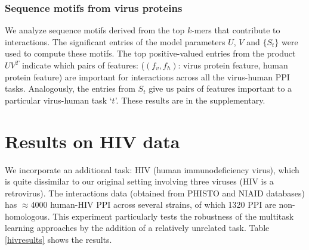 \documentclass{bioinfo}
\begin{document}







\subsubsection{Sequence motifs from virus proteins}
We analyze sequence motifs derived from the top $k$-mers that contribute to interactions. The significant entries of the model parameters $U$, $V$ and $\{S_t\}$ were used to 
compute these motifs. The top positive-valued entries from the product $U V^T$ indicate which pairs of features: ($(f_v, f_h)$: virus protein feature, human protein feature) are important for interactions across all the virus-human PPI tasks.
Analogously, the entries from $S_t$ give us pairs of features important to a particular virus-human task `$t$'.
These results are in the supplementary.\\


\section{Results on HIV data}
We incorporate an additional task: HIV (human immunodeficiency virus), which is quite dissimilar to our original setting involving three viruses (HIV is a retrovirus). The interactions data (obtained from PHISTO and NIAID databases) has $\approx$4000 human-HIV PPI across several strains, of which 1320 PPI are non-homologous. This experiment particularly tests the robustness of the multitask learning approaches by the addition of a relatively unrelated task. Table \ref{hivresults} shows the results.
\end{document}
